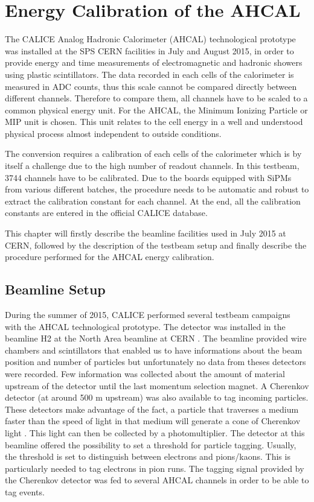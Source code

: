 \chapter{Energy Calibration of the AHCAL}
\label{chap:ECalibAHCAL}

The CALICE Analog Hadronic Calorimeter (AHCAL) technological prototype was installed at the SPS CERN facilities in July and August 2015, in order to provide energy and time measurements of electromagnetic and hadronic showers using plastic scintillators. The data recorded in each cells of the calorimeter is measured in ADC counts, thus this scale cannot be compared directly between different channels. Therefore to compare them, all channels have to be scaled to a common physical energy unit. For the AHCAL, the Minimum Ionizing Particle or MIP unit is chosen. This unit relates to the cell energy in a well and understood physical process almost independent to outside conditions.

The conversion requires a calibration of each cells of the calorimeter which is by itself a challenge due to the high number of readout channels. In this testbeam, 3744 channels have to be calibrated. Due to the boards equipped with SiPMs from various different batches, the procedure needs to be automatic and robust to extract the calibration constant for each channel. At the end, all the calibration constants are entered in the official CALICE database.

This chapter will firstly describe the beamline facilities used in July 2015 at CERN, followed by the description of the testbeam setup and finally describe the procedure performed for the AHCAL energy calibration.

\section{Beamline Setup}
\label{sec:beamline}

During the summer of 2015, CALICE performed several testbeam campaigns with the AHCAL technological prototype. The detector was installed in the beamline H2 at the North Area beamline at CERN \cite{H2Beamline}. The beamline provided wire chambers and scintillators that enabled us to have informations about the beam position and number of particles but unfortunately no data from theses detectors were recorded. Few information was collected about the amount of material upstream of the detector until the last momentum selection magnet. A Cherenkov detector (at around 500 m upstream) was also available to tag incoming particles. These detectors make advantage of the fact, a particle that traverses a medium faster than the speed of light in that medium will generate a cone of Cherenkov light \cite{}. This light can then be collected by a photomultiplier. The detector at this beamline offered the possibility to set a threshold for particle tagging. Usually, the threshold is set to distinguish between electrons and pions/kaons. This is particularly needed to tag electrons in pion runs. The tagging signal provided by the Cherenkov detector was fed to several AHCAL channels in order to be able to tag events.\\

